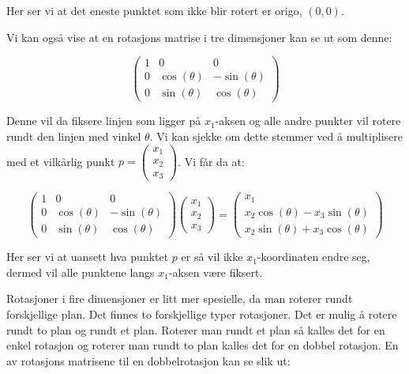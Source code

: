 \documentclass[a4paper,10pt,english]{article}
\begin{document}
    Her ser vi at det eneste punktet som ikke blir rotert er origo, $\left( 0, 0 \right)$.

    Vi kan også vise at en rotasjons matrise i tre dimensjoner kan se ut som denne:
            
    $$
    \left(
    \begin{matrix}
        1 & 0 & 0 \\
        0 & \cos(\theta) & -\sin(\theta) \\
        0 & \sin(\theta) &  \cos(\theta)
    \end{matrix}
    \right)
    $$
            
    Denne vil da fiksere linjen som ligger på $x_{1}$-aksen og alle andre punkter vil rotere rundt den linjen med vinkel $\theta$.
    Vi kan sjekke om dette stemmer ved å multiplisere med et vilkårlig punkt $p = \left( \begin{smallmatrix} x_{1} \\ x_{2} \\ x_{3} \end{smallmatrix} \right)$. Vi får da at:

    $$
    \left(
    \begin{matrix}
        1 & 0 & 0 \\
        0 & \cos(\theta) & -\sin(\theta) \\
        0 & \sin(\theta) &  \cos(\theta)
    \end{matrix}
    \right)
    \left(
    \begin{matrix}
        x_{1} \\ x_{2} \\ x_{3}
    \end{matrix}
    \right) =
    \left(
    \begin{matrix}
        x_{1} \\
        x_{2}\cos(\theta) - x_{3}\sin(\theta) \\
        x_{2}\sin(\theta) + x_{3}\cos(\theta)
    \end{matrix}
    \right)
    $$

    Her ser vi at uansett hva punktet $p$ er så vil ikke $x_{1}$-koordinaten endre seg, dermed vil alle punktene langs $x_{1}$-aksen være fiksert.

    Rotasjoner i fire dimensjoner er litt mer spesielle, da man roterer rundt forskjellige plan. Det finnes to forskjellige typer rotasjoner. Det er mulig å rotere rundt to plan og rundt et plan.
    Roterer man rundt et plan så kalles det for en enkel rotasjon og roterer man rundt to plan kalles det for en dobbel rotasjon. En av rotasjons matrisene til en dobbelrotasjon kan se slik ut:
\end{document}
